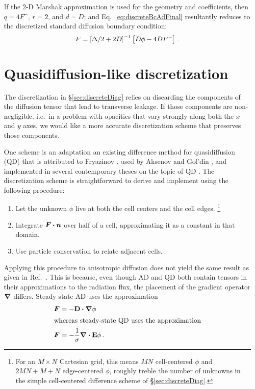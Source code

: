 If the 2-D Marshak approximation is used for the geometry and coefficients, then
$q=4F^-$, $r=2$, and $d=D$; and Eq.~\eqref{eq:discreteBcAdFinal} resultantly
reduces to the
discretized standard diffusion boundary condition:
\begin{equation*}
  F = \left[ \Delta/2 + 2D \right]^{-1} \left[ D\phi - 4DF^-  \right] \,.
\end{equation*}

\section{Quasidiffusion-like discretization}

The discretization in \S\ref{sec:discreteDiag} relies on discarding the
components of the diffusion tensor that lead to transverse leakage. If those
components are non-negligible, i.e.~in a problem with opacities
that vary strongly along both the $x$ and $y$ axes, we would like a
more accurate discretization scheme that preserves those components.

One scheme is an adaptation an existing difference method for quasidiffusion
(QD) that is attributed to Fryazinov \cite{Fry1976}, used by Aksenov and Gol'din
\cite{Aks1979}, and implemented in several contemporary theses on the topic of
QD \cite{Val2002,Wie2009}. The discretization scheme is straightforward to
derive and implement using the following procedure:
\begin{enumerate}
  \item Let the unknown $\phi$ live at both the cell centers and the
  cell edges.%
  \footnote{%
  For an $M\times N$ Cartesian grid, this means $MN$
  cell-centered $\phi$ and $2MN + M + N$ edge-centered $\phi$, roughly treble
  the number of unknowns in the simple cell-centered difference scheme of
  \S\ref{sec:discreteDiag}.%
  }
  \item Integrate $\bm{F}\bm{\cdot} \bm{n}$ over half of a cell, approximating
  it as a constant in that domain.
  \item Use particle conservation to relate adjacent cells.
\end{enumerate}

Applying this procedure to anisotropic diffusion does not yield the same result
as given in Ref.~\cite{Val2002}. This is because, even though AD and QD both
contain tensors
in their approximations to the radiation flux, the placement of the gradient
operator $\bm{\nabla}$ differs. Steady-state AD uses the approximation
\begin{align*}
  \bm{F} &= - \mathbf{D} \bm{\cdot} \bm{\nabla} \phi
  \\ 
  \intertext{whereas steady-state QD uses the approximation}
  \bm{F} &= - \frac{1}{\sigma} \bm{\nabla} \bm{\cdot} \mathbf{E} \phi\,.
\end{align*}

